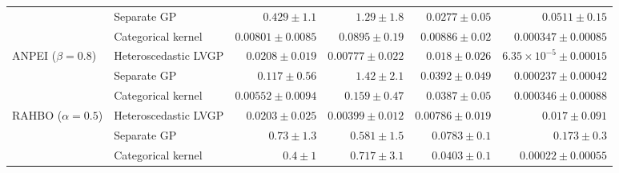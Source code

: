 \begin{table}[htbp]
\begin{tabular}{llrrrr}
 & Separate GP & $0.429 \pm 1.1$ & $1.29 \pm 1.8$ & $0.0277 \pm 0.05$ & $0.0511 \pm 0.15$ \\
 & Categorical kernel & {\boldmath$0.00801 \pm 0.0085$} & {\boldmath$0.0895 \pm 0.19$} & $0.00886 \pm 0.02$ & {\boldmath$0.000347 \pm 0.00085$} \\
\midrule
ANPEI ($\beta=0.8$) & Heteroscedastic LVGP & $0.0208 \pm 0.019$ & {\boldmath$0.00777 \pm 0.022$} & {\boldmath$0.018 \pm 0.026$} & {\boldmath$6.35{\times}10^{-5} \pm 0.00015$} \\
 & Separate GP & $0.117 \pm 0.56$ & $1.42 \pm 2.1$ & $0.0392 \pm 0.049$ & $0.000237 \pm 0.00042$ \\
 & Categorical kernel & {\boldmath$0.00552 \pm 0.0094$} & $0.159 \pm 0.47$ & $0.0387 \pm 0.05$ & $0.000346 \pm 0.00088$ \\
\midrule
RAHBO ($\alpha=0.5$) & Heteroscedastic LVGP & {\boldmath$0.0203 \pm 0.025$} & \colorbox{green!20}{{\boldmath$0.00399 \pm 0.012$}} & {\boldmath$0.00786 \pm 0.019$} & $0.017 \pm 0.091$ \\
 & Separate GP & $0.73 \pm 1.3$ & $0.581 \pm 1.5$ & $0.0783 \pm 0.1$ & $0.173 \pm 0.3$ \\
 & Categorical kernel & $0.4 \pm 1$ & $0.717 \pm 3.1$ & $0.0403 \pm 0.1$ & {\boldmath$0.00022 \pm 0.00055$} \\
\bottomrule
\end{tabular}
\end{table}
